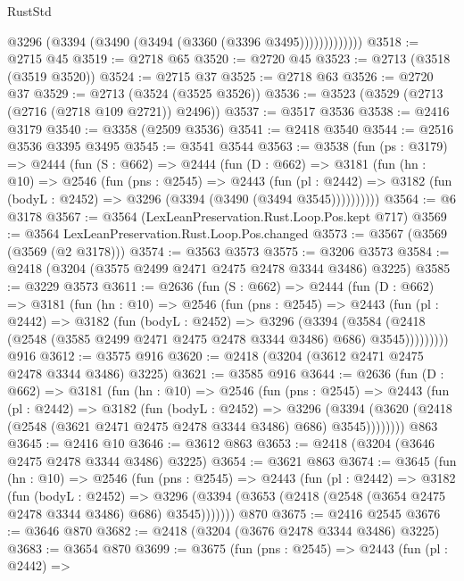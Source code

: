 \begin{lexlean}{RustStd}
\begin{coremodule}
                  @3296 (@3394 (@3490 (@3494 (@3360 (@3396 @3495)))))))))))))
@3518 := @2715 @45
@3519 := @2718 @65
@3520 := @2720 @45
@3523 := @2713 (@3518 (@3519 @3520))
@3524 := @2715 @37
@3525 := @2718 @63
@3526 := @2720 @37
@3529 := @2713 (@3524 (@3525 @3526))
@3536 := @3523 (@3529 (@2713 (@2716 (@2718 @109 @2721)) @2496))
@3537 := @3517 @3536
@3538 := @2416 @3179
@3540 := @3358 (@2509 @3536)
@3541 := @2418 @3540
@3544 := @2516 @3536 @3395 @3495
@3545 := @3541 @3544
@3563 := @3538
    (fun (ps : @3179) =>
    @2444
      (fun (S : @662) =>
      @2444
        (fun (D : @662) =>
        @3181
          (fun (hn : @10) =>
          @2546
            (fun (pns : @2545) =>
            @2443
              (fun (pl : @2442) =>
              @3182 (fun (bodyL : @2452) => @3296 (@3394 (@3490 (@3494 @3545))))))))))
@3564 := @6 @3178
@3567 := @3564 (LexLeanPreservation.Rust.Loop.Pos.kept @717)
@3569 := @3564 LexLeanPreservation.Rust.Loop.Pos.changed
@3573 := @3567 (@3569 (@3569 (@2 @3178)))
@3574 := @3563 @3573
@3575 := @3206 @3573
@3584 := @2418 (@3204 (@3575 @2499 @2471 @2475 @2478 @3344 @3486) @3225)
@3585 := @3229 @3573
@3611 := @2636
    (fun (S : @662) =>
    @2444
      (fun (D : @662) =>
      @3181
        (fun (hn : @10) =>
        @2546
          (fun (pns : @2545) =>
          @2443
            (fun (pl : @2442) =>
            @3182
              (fun (bodyL : @2452) =>
              @3296
                (@3394
                  (@3584
                    (@2418 (@2548 (@3585 @2499 @2471 @2475 @2478 @3344 @3486) @686) @3545)))))))))
    @916
@3612 := @3575 @916
@3620 := @2418 (@3204 (@3612 @2471 @2475 @2478 @3344 @3486) @3225)
@3621 := @3585 @916
@3644 := @2636
    (fun (D : @662) =>
    @3181
      (fun (hn : @10) =>
      @2546
        (fun (pns : @2545) =>
        @2443
          (fun (pl : @2442) =>
          @3182
            (fun (bodyL : @2452) =>
            @3296
              (@3394 (@3620 (@2418 (@2548 (@3621 @2471 @2475 @2478 @3344 @3486) @686) @3545))))))))
    @863
@3645 := @2416 @10
@3646 := @3612 @863
@3653 := @2418 (@3204 (@3646 @2475 @2478 @3344 @3486) @3225)
@3654 := @3621 @863
@3674 := @3645
    (fun (hn : @10) =>
    @2546
      (fun (pns : @2545) =>
      @2443
        (fun (pl : @2442) =>
        @3182
          (fun (bodyL : @2452) =>
          @3296 (@3394 (@3653 (@2418 (@2548 (@3654 @2475 @2478 @3344 @3486) @686) @3545)))))))
    @870
@3675 := @2416 @2545
@3676 := @3646 @870
@3682 := @2418 (@3204 (@3676 @2478 @3344 @3486) @3225)
@3683 := @3654 @870
@3699 := @3675
    (fun (pns : @2545) =>
    @2443
      (fun (pl : @2442) =>

\end{coremodule}
\end{lexlean}
